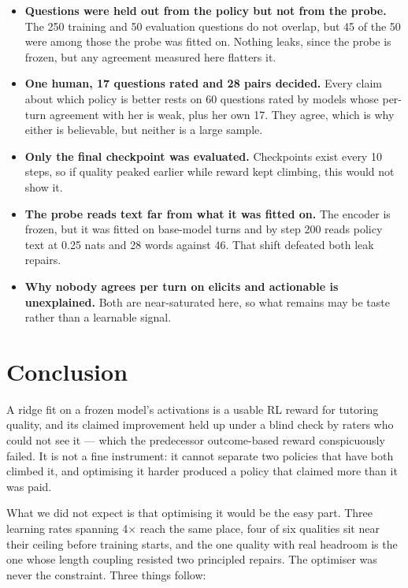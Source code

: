\documentclass[11pt]{article}
\newcommand{\qual}[1]{\textsf{#1}}
\begin{document}
\begin{itemize}
\item \textbf{Questions were held out from the policy but not from the probe.} The 250 training and 50
evaluation questions do not overlap, but 45 of the 50 were among those the probe was fitted on. Nothing
leaks, since the probe is frozen, but any agreement measured here flatters it.
\item \textbf{One human, 17 questions rated and 28 pairs decided.} Every claim about which policy is better
rests on 60 questions rated by models whose per-turn agreement with her is weak, plus her own 17. They
agree, which is why either is believable, but neither is a large sample.
\item \textbf{Only the final checkpoint was evaluated.} Checkpoints exist every 10 steps, so if quality
peaked earlier while reward kept climbing, this would not show it.
\item \textbf{The probe reads text far from what it was fitted on.} The encoder is frozen, but it was fitted
on base-model turns and by step 200 reads policy text at 0.25 nats and 28 words against 46. That shift
defeated both \qual{leak} repairs.
\item \textbf{Why nobody agrees per turn on \qual{elicits} and \qual{actionable} is unexplained.} Both are
near-saturated here, so what remains may be taste rather than a learnable signal.
\end{itemize}

\section{Conclusion}
\label{sec:conclusion}

A ridge fit on a frozen model's activations is a usable RL reward for tutoring quality, and its claimed
improvement held up under a blind check by raters who could not see it --- which the predecessor
outcome-based reward conspicuously failed. It is not a fine instrument: it cannot separate two policies that
have both climbed it, and optimising it harder produced a policy that claimed more than it was paid.

What we did not expect is that optimising it would be the easy part. Three learning rates spanning
4$\times$ reach the same place, four of six qualities sit near their ceiling before training starts, and the
one quality with real headroom is the one whose length coupling resisted two principled repairs. The
optimiser was never the constraint. Three things follow:
\end{document}
